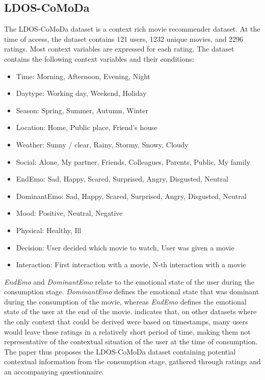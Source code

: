 \subsection{LDOS-CoMoDa}
The LDOS-CoMoDa dataset is a context rich movie recommender dataset\cite{comoda}.
At the time of access, the dataset contains 121 users, 1232 unique movies, and 2296 ratings.
Most context variables are expressed for each rating.
The dataset contains the following context variables and their conditions:
\begin{itemize}
    \item Time: Morning, Afternoon, Evening, Night
    \item Daytype: Working day, Weekend, Holiday
    \item Season: Spring, Summer, Autumn, Winter
    \item Location:  Home, Public place, Friend's house
    \item Weather: Sunny / clear, Rainy, Stormy, Snowy, Cloudy
    \item Social: Alone, My partner, Friends, Colleagues, Parents, Public, My family
    \item EndEmo: Sad, Happy, Scared, Surprised, Angry, Disgusted, Neutral
    \item DominantEmo: Sad, Happy, Scared, Surprised, Angry, Disgusted, Neutral
    \item Mood: Positive, Neutral, Negative
    \item Physical: Healthy, Ill
    \item Decision: User decided which movie to watch, User was given a movie
    \item Interaction: First interaction with a movie, N-th interaction with a movie
\end{itemize}
\textit{EndEmo} and \textit{DominantEmo} relate to the emotional state of the user during the consumption stage.
\textit{DominantEmo} defines the emotional state that was dominant during the consumption of the movie, whereas \textit{EndEmo} defines the emotional state of the user at the end of the movie\cite{COMODA2013}.
\cite{COMODA2013} indicates that, on other datasets where the only context that could be derived were based on timestamps, many users would leave these ratings in a relatively short period of time, making them not representative of the contextual situation of the user at the time of consumption.
The paper thus proposes the LDOS-CoMoDa dataset containing potential contextual information from the consumption stage, gathered through ratings and an accompanying questionnaire.
